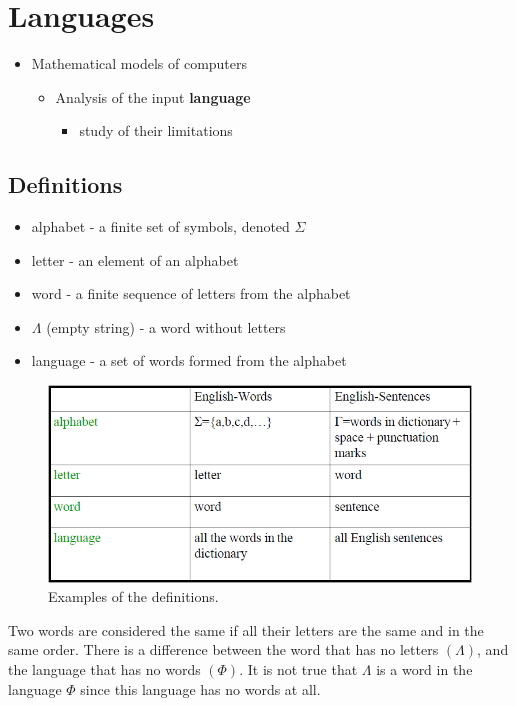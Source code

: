 \section{Languages}

\begin{itemize}
    \item Mathematical models of computers
    \begin{itemize}
        \item Analysis of the input \textbf{language}
        \begin{itemize}
            \item study of their limitations
        \end{itemize}
    \end{itemize}
\end{itemize}

\subsection{Definitions}
\begin{itemize}
    \item alphabet - a finite set of symbols, denoted $\Sigma$
    \item letter - an element of an alphabet
    \item word - a finite sequence of letters from the alphabet
    \item $\Lambda$ (empty string) - a word without letters
    \item language - a set of words formed from the alphabet
\end{itemize}
\begin{figure}[!ht]
    \centering
    \includegraphics[width=\linewidth]{lectures/figures/definitions.png}
    \caption{Examples of the definitions.}
\end{figure}

Two words are considered the same if all their letters are the same and in the same order.
There is a difference between the word that has no letters $(\Lambda)$, and the language that has no words $(\Phi)$.
It is not true that $\Lambda$ is a word in the language $\Phi$ since this language has no words at all.

